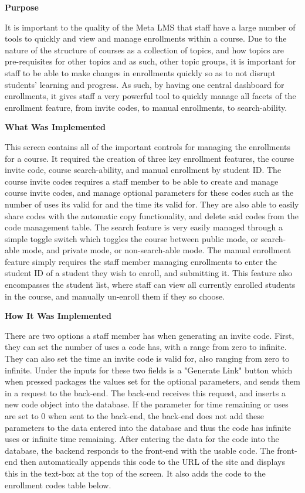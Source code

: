 \textbf{Purpose}

It is important to the quality of the Meta LMS that staff have a large number of tools to quickly and view and manage enrollments within a course. Due to the nature of the structure of courses as a collection of topics, and how topics are pre-requisites for other topics and as such, other topic groups, it is important for staff to be able to make changes in enrollments quickly so as to not disrupt students' learning and progress. As such, by having one central dashboard for enrollments, it gives staff a very powerful tool to quickly manage all facets of the enrollment feature, from invite codes, to manual enrollments, to search-ability.

\textbf{What Was Implemented}

This screen contains all of the important controls for managing the enrollments for a course. It required the creation of three key enrollment features, the course invite code, course search-ability, and manual enrollment by student ID. The course invite codes requires a staff member to be able to create and manage course invite codes, and manage optional parameters for these codes such as the number of uses its valid for and the time its valid for. They are also able to easily share codes with the automatic copy functionality, and delete said codes from the code management table. The search feature is very easily managed through a simple toggle switch which toggles the course between public mode, or search-able mode, and private mode, or non-search-able mode. The manual enrollment feature simply requires the staff member managing enrollments to enter the student ID of a student they wish to enroll, and submitting it. This feature also encompasses the student list, where staff can view all currently enrolled students in the course, and manually un-enroll them if they so choose.

\textbf{How It Was Implemented}

There are two options a staff member has when generating an invite code. First, they can set the number of uses a code has, with a range from zero to infinite. They can also set the time an invite code is valid for, also ranging from zero to infinite. Under the inputs for these two fields is a "Generate Link" button which when pressed packages the values set for the optional parameters, and sends them in a request to the back-end. The back-end receives this request, and inserts a new code object into the database. If the parameter for time remaining or uses are set to 0 when sent to the back-end, the back-end does not add these parameters to the data entered into the database and thus the code has infinite uses or infinite time remaining. After entering the data for the code into the database, the backend responds to the front-end with the usable code. The front-end then automatically appends this code to the URL of the site and displays this in the text-box at the top of the screen. It also adds the code to the enrollment codes table below.

